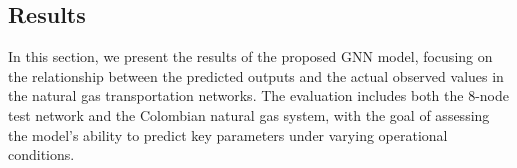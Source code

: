

\subsection{Results}

In this section, we present the results of the proposed GNN model, focusing on the relationship between the predicted outputs and the actual observed values in the natural gas transportation networks. The evaluation includes both the 8-node test network and the Colombian natural gas system, with the goal of assessing the model's ability to predict key parameters under varying operational conditions. 


%
%     
%

